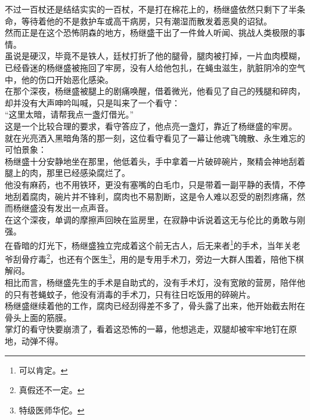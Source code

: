 \begin{multicols}{\theparacolNo}
不过一百杖还是结结实实的一百杖，不是打在棉花上的，杨继盛依然只剩下了半条命，等待着他的不是救护车或高干病房，只有潮湿而散发着恶臭的诏狱。\\

然而正是在这个恐怖阴森的地方，杨继盛干出了一件耸人听闻、挑战人类极限的事情。\\

虽说是硬汉，毕竟不是铁人，廷杖打折了他的腿骨，腿肉被打掉，一片血肉模糊，已经昏迷的杨继盛被拖回了牢房，没有人给他包扎，在蝇虫滋生，肮脏阴冷的空气中，他的伤口开始恶化感染。\\

在那个深夜，杨继盛被腿上的剧痛唤醒，借着微光，他看见了自己的残腿和碎肉，却并没有大声呻吟叫喊，只是叫来了一个看守：\\

“这里太暗，请帮我点一盏灯借光。”\\

这是一个比较合理的要求，看守答应了，他点亮一盏灯，靠近了杨继盛的牢房。\\

就在光亮洒入黑暗角落的那一刻，这位看守看见了一幕让他魂飞魄散、永生难忘的可怕景象：\\

杨继盛十分安静地坐在那里，他低着头，手中拿着一片破碎碗片，聚精会神地刮着腿上的肉，那里已经感染腐烂了。\\

他没有麻药，也不用铁环，更没有塞嘴的白毛巾，只是带着一副平静的表情，不停地刮着腐肉，碗片并不锋利，腐肉也不易割断，这是令人难以忍受的剧烈疼痛，然而杨继盛没有发出一点声音。\\

在这个深夜，单调的摩擦声回映在监房里，在寂静中诉说着这无与伦比的勇敢与刚强。\\

在昏暗的灯光下，杨继盛独立完成着这个前无古人，后无来者\footnote{可以肯定。}的手术，当年关老爷刮骨疗毒\footnote{真假还不一定。}，也还有个医生\footnote{特级医师华佗。}，用的是专用手术刀，旁边一大群人围着，陪他下棋解闷。\\

相比而言，杨继盛先生的手术是自助式的，没有手术灯，没有宽敞的营房，陪伴他的只有苍蝇蚊子，他没有消毒的手术刀，只有往日吃饭用的碎碗片。\\

杨继盛继续着他的工作，腐肉已经刮得差不多了，骨头露了出来，他开始截去附在骨头上面的筋膜。\\

掌灯的看守快要崩溃了，看着这恐怖的一幕，他想逃走，双腿却被牢牢地钉在原地，动弹不得。\\


\end{multicols}
